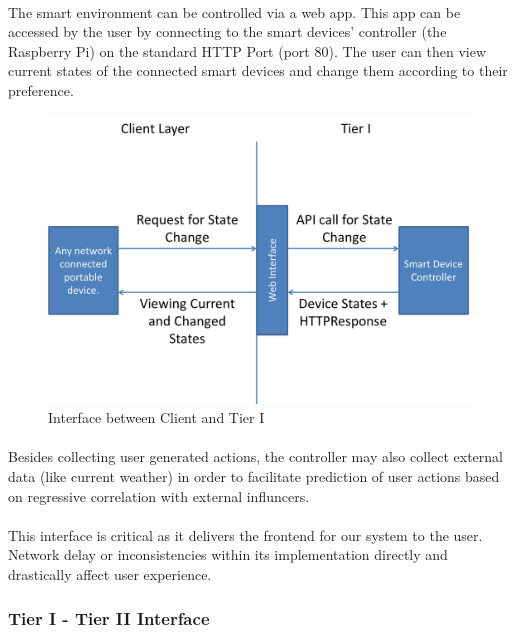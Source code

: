 	\paragraph{}
	The smart environment can be controlled via a web app. This app can be accessed by the user by connecting to the smart devices' controller (the Raspberry Pi) on the standard HTTP Port (port 80). The user can then view current states of the connected smart devices and change them according to their preference.
	\begin{figure}[H]
		\includegraphics[width=\textwidth]{./Chapter3/client-t1}
			\caption{Interface between Client and Tier I}
	\end{figure}
	\paragraph{}
	Besides collecting user generated actions, the controller may also collect external data (like current weather) in order to facilitate prediction of user actions based on regressive correlation with external influncers.
	\paragraph{}
	This interface is critical as it delivers the frontend for our system to the user. Network delay or inconsistencies within its implementation directly and drastically affect user experience.
	
	\subsubsection*{Tier I - Tier II Interface}
